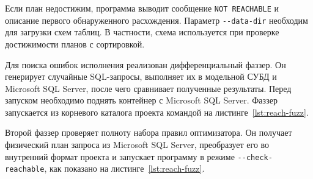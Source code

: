 \documentclass[14pt, russian]{scrartcl}
\begin{document}
Если план недостижим, программа выводит сообщение \verb|NOT REACHABLE| и
описание первого обнаруженного расхождения. Параметр \verb|--data-dir|
необходим для загрузки схем таблиц. В частности, схема используется при
проверке достижимости планов с сортировкой.






Для поиска ошибок исполнения реализован дифференциальный фаззер. Он генерирует
случайные SQL-запросы, выполняет их в модельной СУБД и Microsoft SQL Server,
после чего сравнивает полученные результаты. Перед запуском необходимо поднять
контейнер с Microsoft SQL Server. Фаззер запускается из корневого каталога
проекта командой на листинге~\ref{lst:reach-fuzz}.

Второй фаззер проверяет полноту набора правил оптимизатора. Он получает
физический план запроса из Microsoft SQL Server, преобразует его во внутренний
формат проекта и запускает программу в режиме \verb|--check-reachable|, как
показано на листинге~\ref{lst:reach-fuzz}.
\end{document}

